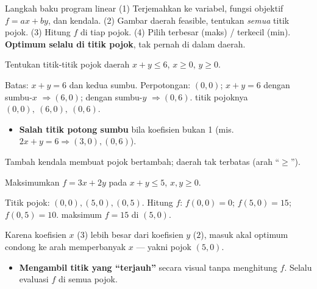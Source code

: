 \begin{ingat}{Langkah baku program linear}
(1) Terjemahkan ke variabel, fungsi objektif $f=ax+by$, dan kendala. (2) Gambar
daerah feasible, tentukan \emph{semua} titik pojok. (3) Hitung $f$ di tiap pojok.
(4) Pilih terbesar (maks) / terkecil (min). \textbf{Optimum selalu di titik
pojok}, tak pernah di dalam daerah.
\end{ingat}

\begin{soalbox}{}
Tentukan titik-titik pojok daerah $x+y\le6$, $x\ge0$, $y\ge0$.
\end{soalbox}

\jawab
{} Batas: $x+y=6$ dan kedua sumbu.
 Perpotongan: $(0,0)$; $x+y=6$ dengan sumbu-$x$ $\Rightarrow(6,0)$;
dengan sumbu-$y$ $\Rightarrow(0,6)$.
\jadi titik pojoknya $(0,0),\ (6,0),\ (0,6)$.

\begin{jebakan}
\begin{itemize}[leftmargin=*,topsep=2pt]
  \item \textbf{Salah titik potong sumbu} bila koefisien bukan 1 (mis.\
  $2x+y=6\Rightarrow(3,0),(0,6)$).
\end{itemize}
\end{jebakan}

\begin{variasi}
Tambah kendala membuat pojok bertambah; daerah tak terbatas (arah ``$\ge$'').
\end{variasi}

\begin{soalbox}{}
Maksimumkan $f=3x+2y$ pada $x+y\le5$, $x,y\ge0$.
\end{soalbox}

\jawab
{} Titik pojok: $(0,0),(5,0),(0,5)$.
 Hitung $f$: $f(0,0)=0$; $f(5,0)=15$; $f(0,5)=10$.
\jadi maksimum $f=15$ di $(5,0)$.

\begin{tips}
Karena koefisien $x$ ($3$) lebih besar dari koefisien $y$ ($2$), masuk akal
optimum condong ke arah memperbanyak $x$ --- yakni pojok $(5,0)$.
\end{tips}

\begin{jebakan}
\begin{itemize}[leftmargin=*,topsep=2pt]
  \item \textbf{Mengambil titik yang ``terjauh''} secara visual tanpa menghitung
  $f$. Selalu evaluasi $f$ di semua pojok.
\end{itemize}
\end{jebakan}


